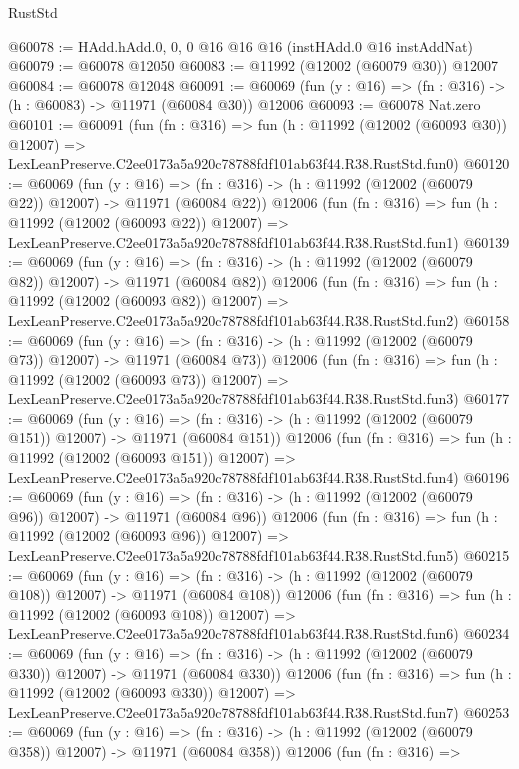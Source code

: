 \begin{lexlean}{RustStd}
\begin{coremodule}
@60078 := HAdd.hAdd.{0, 0, 0} @16 @16 @16 (instHAdd.{0} @16 instAddNat)
@60079 := @60078 @12050
@60083 := @11992 (@12002 (@60079 @30)) @12007
@60084 := @60078 @12048
@60091 := @60069 (fun (y : @16) => (fn : @316) -> (h : @60083) -> @11971 (@60084 @30)) @12006
@60093 := @60078 Nat.zero
@60101 := @60091
    (fun (fn : @316) =>
    fun (h : @11992 (@12002 (@60093 @30)) @12007) =>
    LexLeanPreserve.C2ee0173a5a920c78788fdf101ab63f44.R38.RustStd.fun0)
@60120 := @60069
    (fun (y : @16) =>
    (fn : @316) -> (h : @11992 (@12002 (@60079 @22)) @12007) -> @11971 (@60084 @22))
    @12006
    (fun (fn : @316) =>
    fun (h : @11992 (@12002 (@60093 @22)) @12007) =>
    LexLeanPreserve.C2ee0173a5a920c78788fdf101ab63f44.R38.RustStd.fun1)
@60139 := @60069
    (fun (y : @16) =>
    (fn : @316) -> (h : @11992 (@12002 (@60079 @82)) @12007) -> @11971 (@60084 @82))
    @12006
    (fun (fn : @316) =>
    fun (h : @11992 (@12002 (@60093 @82)) @12007) =>
    LexLeanPreserve.C2ee0173a5a920c78788fdf101ab63f44.R38.RustStd.fun2)
@60158 := @60069
    (fun (y : @16) =>
    (fn : @316) -> (h : @11992 (@12002 (@60079 @73)) @12007) -> @11971 (@60084 @73))
    @12006
    (fun (fn : @316) =>
    fun (h : @11992 (@12002 (@60093 @73)) @12007) =>
    LexLeanPreserve.C2ee0173a5a920c78788fdf101ab63f44.R38.RustStd.fun3)
@60177 := @60069
    (fun (y : @16) =>
    (fn : @316) -> (h : @11992 (@12002 (@60079 @151)) @12007) -> @11971 (@60084 @151))
    @12006
    (fun (fn : @316) =>
    fun (h : @11992 (@12002 (@60093 @151)) @12007) =>
    LexLeanPreserve.C2ee0173a5a920c78788fdf101ab63f44.R38.RustStd.fun4)
@60196 := @60069
    (fun (y : @16) =>
    (fn : @316) -> (h : @11992 (@12002 (@60079 @96)) @12007) -> @11971 (@60084 @96))
    @12006
    (fun (fn : @316) =>
    fun (h : @11992 (@12002 (@60093 @96)) @12007) =>
    LexLeanPreserve.C2ee0173a5a920c78788fdf101ab63f44.R38.RustStd.fun5)
@60215 := @60069
    (fun (y : @16) =>
    (fn : @316) -> (h : @11992 (@12002 (@60079 @108)) @12007) -> @11971 (@60084 @108))
    @12006
    (fun (fn : @316) =>
    fun (h : @11992 (@12002 (@60093 @108)) @12007) =>
    LexLeanPreserve.C2ee0173a5a920c78788fdf101ab63f44.R38.RustStd.fun6)
@60234 := @60069
    (fun (y : @16) =>
    (fn : @316) -> (h : @11992 (@12002 (@60079 @330)) @12007) -> @11971 (@60084 @330))
    @12006
    (fun (fn : @316) =>
    fun (h : @11992 (@12002 (@60093 @330)) @12007) =>
    LexLeanPreserve.C2ee0173a5a920c78788fdf101ab63f44.R38.RustStd.fun7)
@60253 := @60069
    (fun (y : @16) =>
    (fn : @316) -> (h : @11992 (@12002 (@60079 @358)) @12007) -> @11971 (@60084 @358))
    @12006
    (fun (fn : @316) =>

\end{coremodule}
\end{lexlean}
